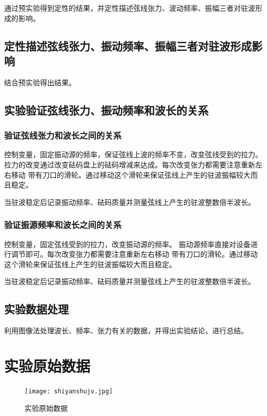 \documentclass{ctexart}
\begin{document}
  通过预实验得到定性的结果，并定性描述弦线张力、波动频率、振幅三者对驻波形成的影响。
  \subsection{定性描述弦线张力、振动频率、振幅三者对驻波形成影响}
  结合预实验得出结果。
  \subsection{实验验证弦线张力、振动频率和波长的关系}
    \subsubsection{验证弦线张力和波长之间的关系}
    控制变量，固定振动源的频率，保证弦线上波的频率不变，改变弦线受到的拉力。
    拉力的改变通过改变砝码盘上的砝码增减来达成。每次改变张力都需要注意重新左右移动
    带有刀口的滑轮。通过移动这个滑轮来保证弦线上产生的驻波振幅较大而且稳定。

    当驻波稳定后记录振动频率、砝码质量并测量弦线上产生的驻波整数倍半波长。
    \subsubsection{验证振源频率和波长之间的关系}
    控制变量，固定弦线受到的拉力，改变振动源的频率。
    振动源频率直接对设备进行调节即可。每次改变张力都需要注意重新左右移动
    带有刀口的滑轮。通过移动这个滑轮来保证弦线上产生的驻波振幅较大而且稳定。

    当驻波稳定后记录振动频率、砝码质量并测量弦线上产生的驻波整数倍半波长。

  \subsection{实验数据处理}
  利用图像法处理波长、频率、张力有关的数据，并得出实验结论，进行总结。
\newpage

\section{实验原始数据}
\begin{figure}[h]
  \centering
  \texttt{[image: shiyanshujv.jpg]}
  \caption{实验原始数据}\label{shiyanshujv}
\end{figure}
\newpage
\end{document}

